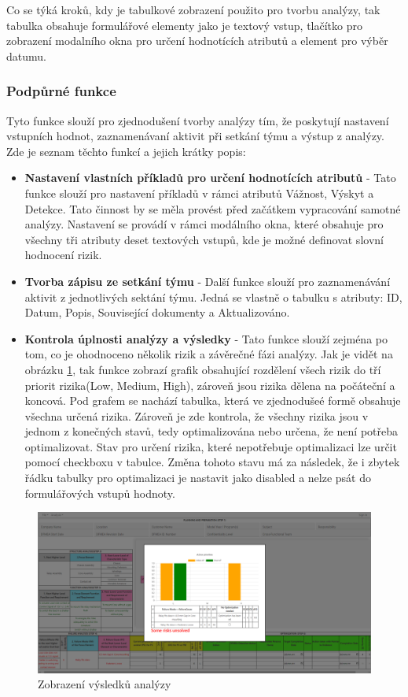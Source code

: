 Co se týká kroků, kdy je tabulkové zobrazení použito pro tvorbu analýzy, tak tabulka obsahuje formulářové elementy jako je textový vstup, tlačítko pro zobrazení modalního okna pro určení hodnotících atributů a element pro výběr datumu. 

\subsubsection{Podpůrné funkce}
Tyto funkce slouží pro zjednodušení tvorby analýzy tím, že poskytují nastavení vstupních hodnot, zaznamenávaní aktivit při setkání týmu a výstup z analýzy. Zde je seznam těchto funkcí a jejich krátky popis:
\begin{itemize}
    \item \textbf{Nastavení vlastních příkladů pro určení hodnotících atributů} - Tato funkce slouží pro nastavení příkladů v rámci atributů Vážnost, Výskyt a Detekce. Tato činnost by se měla provést před začátkem vypracování samotné analýzy. Nastavení se provádí v rámci modálního okna, které obsahuje pro všechny tři atributy deset textových vstupů, kde je možné definovat slovní hodnocení rizik.
    \item \textbf{Tvorba zápisu ze setkání týmu} - Další funkce slouží pro zaznamenávání aktivit z jednotlivých sektání týmu. Jedná se vlastně o tabulku s atributy: ID, Datum, Popis, Související dokumenty a Aktualizováno. 
 \item \textbf{Kontrola úplnosti analýzy a výsledky} - Tato funkce slouží zejména po tom, co je ohodnoceno několik rizik a závěrečné fázi analýzy. Jak je vidět na obrázku \ref{fig:results}, tak funkce zobrazí grafik obsahující rozdělení všech rizik do tří priorit rizika(Low, Medium, High), zároveň jsou rizika dělena na počáteční a koncová. Pod grafem se nachází tabulka, která ve zjednodušeé formě obsahuje všechna určená rizika. Zároveň je zde kontrola, že všechny rizika jsou v jednom z konečných stavů, tedy optimalizována nebo určena, že není potřeba optimalizovat. Stav pro určení rizika, které nepotřebuje optimalizaci lze určit pomocí checkboxu v tabulce. Změna tohoto stavu má za následek, že i zbytek řádku tabulky pro optimalizaci je nastavit jako disabled a nelze psát do formulářových vstupů hodnoty. 
\end{itemize}
\begin{figure}[h]
\centering
	\includegraphics[width=1.0\textwidth]{Figures/results.png}
	\caption{Zobrazení výsledků analýzy}
	\label{fig:results}
\end{figure}
